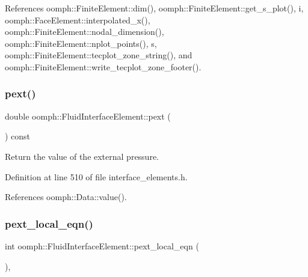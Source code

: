 References oomph\+::\+Finite\+Element\+::dim(), oomph\+::\+Finite\+Element\+::get\+\_\+s\+\_\+plot(), i, oomph\+::\+Face\+Element\+::interpolated\+\_\+x(), oomph\+::\+Finite\+Element\+::nodal\+\_\+dimension(), oomph\+::\+Finite\+Element\+::nplot\+\_\+points(), s, oomph\+::\+Finite\+Element\+::tecplot\+\_\+zone\+\_\+string(), and oomph\+::\+Finite\+Element\+::write\+\_\+tecplot\+\_\+zone\+\_\+footer().

\mbox{\label{classoomph_1_1FluidInterfaceElement_a7c0a2a21afce911c301c75febd3ba44c}} 
\subsubsection{\texorpdfstring{pext()}{pext()}}
{\footnotesize\ttfamily double oomph\+::\+Fluid\+Interface\+Element\+::pext (\begin{DoxyParamCaption}{ }\end{DoxyParamCaption}) const\hspace{0.3cm}{\ttfamily [inline]}}



Return the value of the external pressure. 



Definition at line 510 of file interface\+\_\+elements.\+h.



References oomph\+::\+Data\+::value().

\mbox{\label{classoomph_1_1FluidInterfaceElement_abd4aece98dee8173c6d796e23ccf1e03}} 
\subsubsection{\texorpdfstring{pext\+\_\+local\+\_\+eqn()}{pext\_local\_eqn()}}
{\footnotesize\ttfamily int oomph\+::\+Fluid\+Interface\+Element\+::pext\+\_\+local\+\_\+eqn (\begin{DoxyParamCaption}{ }\end{DoxyParamCaption})\hspace{0.3cm}{\ttfamily [inline]}, {\ttfamily [protected]}}



